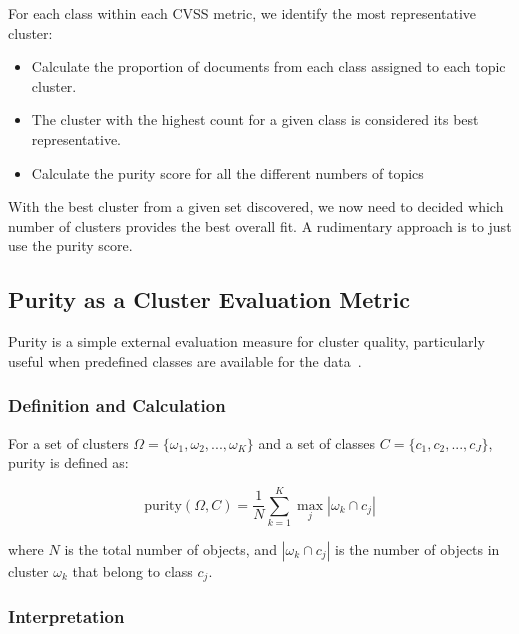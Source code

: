 \documentclass[12pt]{article}
\begin{document}
For each class within each CVSS metric, we identify the most representative cluster:

\begin{itemize}

	\item Calculate the proportion of documents from each class assigned to each topic cluster.

	\item The cluster with the highest count for a given class is considered its best representative.

	\item Calculate the purity score for all the different numbers of topics

\end{itemize}

With the best cluster from a given set discovered, we now need to decided which number of clusters
provides the best overall fit. A rudimentary approach is to just use the purity score.

\subsection{Purity as a Cluster Evaluation Metric}\label{sec:purity}

Purity is a simple external evaluation measure for cluster quality, particularly useful when
predefined classes are available for the data~\cite{purity_usuage}.

\subsubsection*{Definition and Calculation}

For a set of clusters $\Omega = \{\omega_1, \omega_2, ..., \omega_K\}$ and a set of classes $C =
	\{c_1, c_2, ..., c_J\}$, purity is defined as:

\begin{equation}
	\text{purity}(\Omega, C) = \frac{1}{N} \sum_{k=1}^K \max_j |\omega_k \cap c_j|
\end{equation}

where $N$ is the total number of objects, and $|\omega_k \cap c_j|$ is the number of objects in
cluster $\omega_k$ that belong to class $c_j$.

\subsubsection*{Interpretation}
\end{document}
